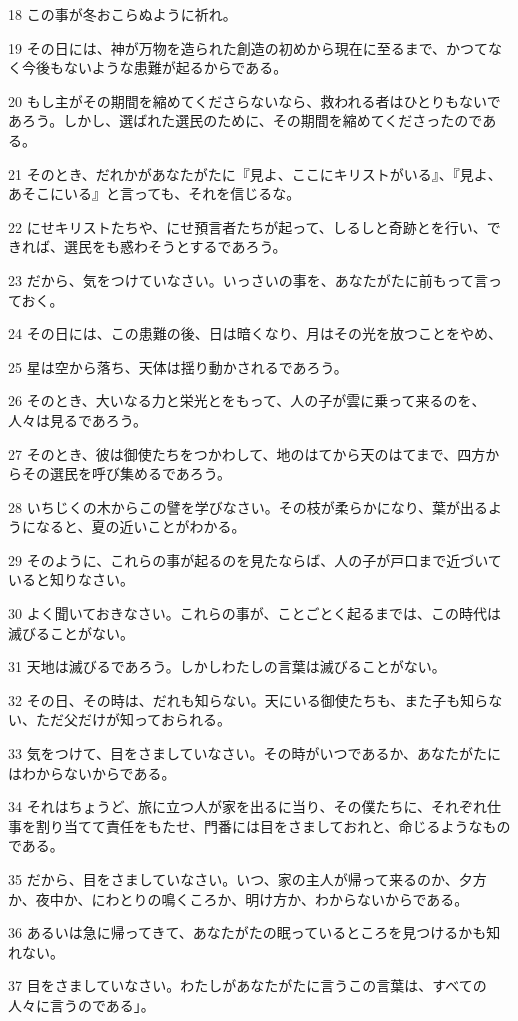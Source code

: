 \par 18 この事が冬おこらぬように祈れ。
\par 19 その日には、神が万物を造られた創造の初めから現在に至るまで、かつてなく今後もないような患難が起るからである。
\par 20 もし主がその期間を縮めてくださらないなら、救われる者はひとりもないであろう。しかし、選ばれた選民のために、その期間を縮めてくださったのである。
\par 21 そのとき、だれかがあなたがたに『見よ、ここにキリストがいる』、『見よ、あそこにいる』と言っても、それを信じるな。
\par 22 にせキリストたちや、にせ預言者たちが起って、しるしと奇跡とを行い、できれば、選民をも惑わそうとするであろう。
\par 23 だから、気をつけていなさい。いっさいの事を、あなたがたに前もって言っておく。
\par 24 その日には、この患難の後、日は暗くなり、月はその光を放つことをやめ、
\par 25 星は空から落ち、天体は揺り動かされるであろう。
\par 26 そのとき、大いなる力と栄光とをもって、人の子が雲に乗って来るのを、人々は見るであろう。
\par 27 そのとき、彼は御使たちをつかわして、地のはてから天のはてまで、四方からその選民を呼び集めるであろう。
\par 28 いちじくの木からこの譬を学びなさい。その枝が柔らかになり、葉が出るようになると、夏の近いことがわかる。
\par 29 そのように、これらの事が起るのを見たならば、人の子が戸口まで近づいていると知りなさい。
\par 30 よく聞いておきなさい。これらの事が、ことごとく起るまでは、この時代は滅びることがない。
\par 31 天地は滅びるであろう。しかしわたしの言葉は滅びることがない。
\par 32 その日、その時は、だれも知らない。天にいる御使たちも、また子も知らない、ただ父だけが知っておられる。
\par 33 気をつけて、目をさましていなさい。その時がいつであるか、あなたがたにはわからないからである。
\par 34 それはちょうど、旅に立つ人が家を出るに当り、その僕たちに、それぞれ仕事を割り当てて責任をもたせ、門番には目をさましておれと、命じるようなものである。
\par 35 だから、目をさましていなさい。いつ、家の主人が帰って来るのか、夕方か、夜中か、にわとりの鳴くころか、明け方か、わからないからである。
\par 36 あるいは急に帰ってきて、あなたがたの眠っているところを見つけるかも知れない。
\par 37 目をさましていなさい。わたしがあなたがたに言うこの言葉は、すべての人々に言うのである」。

